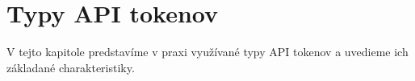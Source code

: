 \chapter{Typy API tokenov}

\label{kap:typy} %

V tejto kapitole predstavíme v praxi využívané typy API tokenov a uvedieme ich základané charakteristiky.

